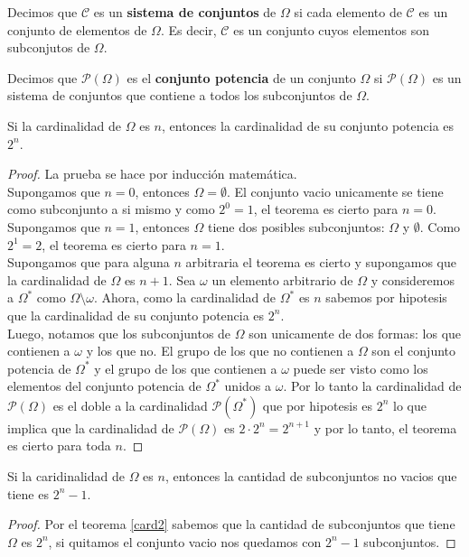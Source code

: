 \begin{dfn}
\label{conj1}
Decimos que $\mathcal{C}$ es un \textbf{sistema de conjuntos} de $\Omega$ si cada elemento de $\mathcal{C}$ es un conjunto de elementos de $\Omega$.  Es decir, $\mathcal{C}$ es un conjunto cuyos elementos son subconjutos de $\Omega$.
\end{dfn}

\begin{dfn}
Decimos que $\mathcal{P}(\Omega)$ es el \textbf{conjunto potencia} de un conjunto $\Omega$ si $\mathcal{P}(\Omega)$ es un sistema de conjuntos que contiene a todos los subconjuntos de $\Omega$.
\end{dfn}

\begin{teo}
\label{card2}
Si la cardinalidad de $\Omega$ es $n$, entonces la cardinalidad de su conjunto potencia es $2^n$.
\end{teo}
\begin{proof}
La prueba se hace por inducción matemática. \\
Supongamos que $n=0$, entonces $\Omega=\emptyset$. El conjunto vacio unicamente se tiene como subconjunto a si mismo y como $2^0=1$, el teorema es cierto para $n=0$. \\
Supongamos que $n=1$, entonces $\Omega$ tiene dos posibles subconjuntos: $\Omega$ y $\emptyset$. Como $2^1=2$, el teorema es cierto para $n=1$. \\
Supongamos que para alguna $n$ arbitraria el teorema es cierto y supongamos que la cardinalidad de $\Omega$ es $n+1$. Sea $\omega$ un elemento arbitrario de $\Omega$ y consideremos a $\Omega^*$ como $\Omega \setminus \omega$. Ahora, como la cardinalidad de $\Omega^*$ es $n$ sabemos por hipotesis que la cardinalidad de su conjunto potencia es $2^n$. \\
Luego, notamos que los subconjuntos de $\Omega$ son unicamente de dos formas: los que contienen a $\omega$ y los que no. El grupo de los que no contienen a $\Omega$ son el conjunto potencia de $\Omega^*$ y el grupo de los que contienen a $\omega$ puede ser visto como los elementos del conjunto potencia de $\Omega^*$ unidos a $\omega$. Por lo tanto la cardinalidad de $\mathcal{P}(\Omega)$ es el doble a la cardinalidad $\mathcal{P}(\Omega^*)$ que por hipotesis es $2^n$ lo que implica que la cardinalidad de $\mathcal{P}(\Omega)$  es $2 \cdot 2^n=2^{n+1}$ y por lo tanto, el teorema es cierto para toda $n$.
\end{proof}

\begin{cor}
\label{card3}
Si la caridinalidad de $\Omega$ es $n$, entonces la cantidad de subconjuntos no vacios que tiene es $2^{n}-1$.
\end{cor}
\begin{proof}
Por el teorema \ref{card2} sabemos que la cantidad de subconjuntos que tiene $\Omega$ es $2^{n}$, si quitamos el conjunto  vacio nos quedamos con $2^{n}-1$ subconjuntos.
\end{proof}

